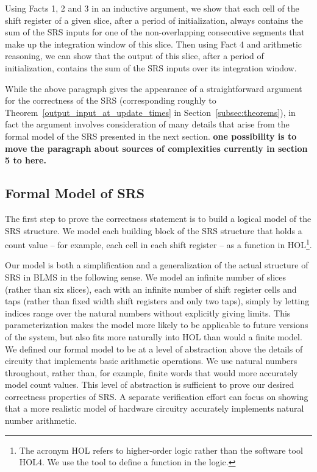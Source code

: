 \documentclass{llncs}
\begin{document}
Using Facts 1, 2 and 3 in an inductive argument, we show that each cell of the shift register of a given slice, after a period of initialization, always contains the sum of the SRS inputs for one of the non-overlapping consecutive segments that make up the integration window of this slice.
Then using Fact 4 and arithmetic reasoning, we can show that the output of this slice, after a period of initialization, contains the sum of the SRS inputs over its integration window.

While the above paragraph gives the appearance of a straightforward argument for the correctness of the SRS (corresponding roughly to Theorem~\ref{output_input_at_update_times} in Section~\ref{subsec:theorems}), in fact the argument involves consideration of many details that arise from the formal model of the SRS presented in the next section. {\bf one possibility is to move the paragraph about sources of complexities currently in section 5 to here.}

\subsection{Formal Model of SRS}
The first step to prove the correctness statement is to build a logical model of the SRS structure.
We model each building block of the SRS structure that holds a count value -- for example, each cell in each shift register -- as a function in HOL\footnote{The acronym HOL refers to higher-order logic rather than the software tool HOL4.
We use the tool to define a function in the logic.}.

Our model is both a simplification and a generalization of the actual structure of SRS in BLMS in the following sense.
We model an infinite number of slices (rather than six slices), each with an infinite number of shift register cells and taps (rather than fixed width shift registers and only two taps), simply by letting indices range over the natural numbers without explicitly giving limits.
This parameterization makes the model more likely to be applicable to future versions of the system, but also fits more naturally into HOL than would a finite model.
We defined our formal model to be at a level of abstraction above the details of circuity that implements basic arithmetic operations.
We use natural numbers throughout, rather than, for example, finite words that would more accurately model count values.
This level of abstraction is sufficient to prove our desired correctness properties of SRS.
A separate verification effort can focus on showing that a more realistic model of hardware circuitry accurately implements natural number arithmetic.
\end{document}
